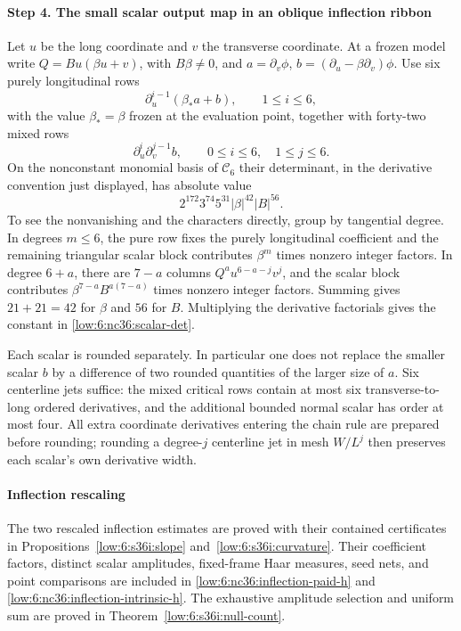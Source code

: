 \documentclass[11pt]{amsart}
\theoremstyle{definition}
\theoremstyle{remark}
\numberwithin{equation}{section}
\begin{document}
\paragraph{Step 4. The small scalar output map in an oblique inflection ribbon}
Let $u$ be the long coordinate and $v$ the transverse coordinate. At a frozen model write $Q=B u(\beta u+v)$, with $B\beta\ne0$, and $a=\partial_v\phi$, $b=(\partial_u-\beta\partial_v)\phi$. Use six purely longitudinal rows
\[
 \partial_u^{i-1}(\beta_*a+b),\qquad 1\le i\le6,
\]
with the value $\beta_*=\beta$ frozen at the evaluation point, together with forty-two mixed rows
\[
 \partial_u^i\partial_v^{j-1}b,\qquad 0\le i\le6,\quad 1\le j\le6.
\]
On the nonconstant monomial basis of $\mathcal C_6$ their determinant, in the derivative convention just displayed, has absolute value
\begin{equation}\label{low:6:nc36:scalar-det}
 2^{172}3^{74}5^{31}|\beta|^{42}|B|^{56}.
\end{equation}
To see the nonvanishing and the characters directly, group by tangential degree. In degrees $m\le6$, the pure row fixes the purely longitudinal coefficient and the remaining triangular scalar block contributes $\beta^m$ times nonzero integer factors. In degree $6+a$, there are $7-a$ columns $Q^a u^{6-a-j}v^j$, and the scalar block contributes $\beta^{7-a}B^{a(7-a)}$ times nonzero integer factors. Summing gives $21+21=42$ for $\beta$ and $56$ for $B$. Multiplying the derivative factorials gives the constant in \eqref{low:6:nc36:scalar-det}.

Each scalar is rounded separately. In particular one does not replace the smaller scalar $b$ by a difference of two rounded quantities of the larger size of $a$. Six centerline jets suffice: the mixed critical rows contain at most six transverse-to-long ordered derivatives, and the additional bounded normal scalar has order at most four. All extra coordinate derivatives entering the chain rule are prepared before rounding; rounding a degree-$j$ centerline jet in mesh $W/L^j$ then preserves each scalar's own derivative width.

\paragraph{Inflection rescaling}\label{low:6:nc36:inflection-scaling}

The two rescaled inflection estimates are proved with their contained certificates in Propositions~\ref{low:6:s36i:slope} and~\ref{low:6:s36i:curvature}. Their coefficient factors, distinct scalar amplitudes, fixed-frame Haar measures, seed nets, and point comparisons are included in \eqref{low:6:nc36:inflection-paid-h} and \eqref{low:6:nc36:inflection-intrinsic-h}. The exhaustive amplitude selection and uniform sum are proved in Theorem~\ref{low:6:s36i:null-count}.
\end{document}
